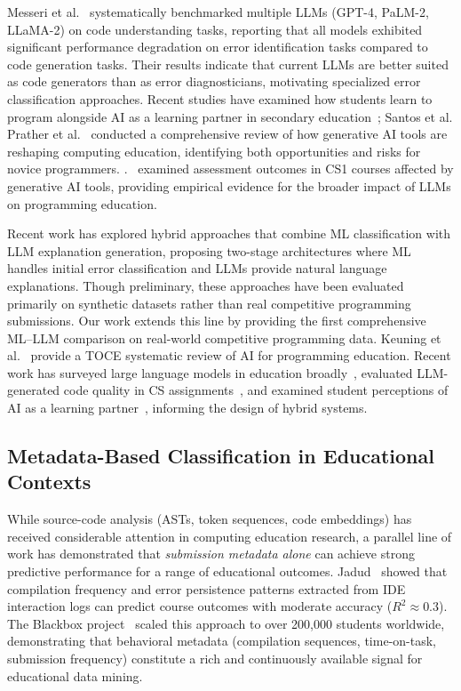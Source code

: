 \documentclass[acmsmall]{acmart}
\begin{document}
Messeri et al.~\cite{prather2024code} systematically benchmarked multiple
LLMs (GPT-4, PaLM-2, LLaMA-2) on code understanding tasks, reporting that
all models exhibited significant performance degradation on error
identification tasks compared to code generation tasks. Their results indicate
that current LLMs are better suited as code generators than as error
diagnosticians, motivating specialized error classification
approaches. Recent studies have examined how students
learn to program alongside AI as a learning partner in secondary education~\cite{kazemitabaar2024impact}; Santos et al. Prather et al.~\cite{prather2023robots} conducted a comprehensive review of how generative AI tools are reshaping computing education, identifying both opportunities and risks for novice programmers. .~\cite{becker2023programming} examined assessment outcomes in CS1
courses affected by generative AI tools, providing empirical evidence for the
broader impact of LLMs on programming education.

Recent work has explored hybrid approaches that combine ML classification
with LLM explanation generation, proposing two-stage architectures where
ML handles initial error classification and LLMs provide natural language
explanations. Though preliminary, these approaches have been evaluated primarily
on synthetic datasets rather than real competitive programming submissions.
Our work extends this line by providing the first comprehensive ML--LLM
comparison on real-world competitive programming data. Keuning et
al.~\cite{keuning2017systematic} provide a TOCE systematic review of AI for programming
education. Recent work has surveyed large language models in
education broadly~\cite{finnie2022robots,kazemitabaar2024impact}, evaluated LLM-generated code quality
in CS assignments~\cite{prather2024code}, and examined student perceptions
of AI as a learning partner~\cite{denny2024prompt,becker2023programming}, informing the design of hybrid systems.

\subsection{Metadata-Based Classification in Educational Contexts}

While source-code analysis (ASTs, token sequences, code embeddings) has
received considerable attention in computing education research, a parallel
line of work has demonstrated that \textit{submission metadata alone} can
achieve strong predictive performance for a range of educational outcomes.
Jadud~\cite{jadud2006methods} showed that compilation frequency and
error persistence patterns extracted from IDE interaction logs can predict
course outcomes with moderate accuracy ($R^2 \approx 0.3$). The Blackbox
project~\cite{brown2014blackbox} scaled this approach to over 200,000
students worldwide, demonstrating that behavioral metadata (compilation
sequences, time-on-task, submission frequency) constitute a rich and
continuously available signal for educational data mining.
\end{document}
